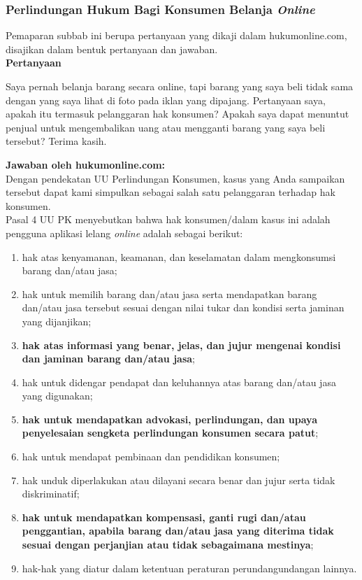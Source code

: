 \subsubsection{Perlindungan Hukum Bagi Konsumen Belanja \textit{Online}}
	Pemaparan subbab ini berupa pertanyaan yang dikaji dalam hukumonline.com, disajikan dalam bentuk pertanyaan dan jawaban.\\
\textbf{Pertanyaan}
\begin{displayquote}
	Saya pernah belanja barang secara online, tapi barang yang saya beli tidak sama dengan yang saya lihat di foto pada iklan yang dipajang. Pertanyaan saya, apakah itu termasuk pelanggaran hak konsumen? Apakah saya dapat menuntut penjual untuk mengembalikan uang atau mengganti barang yang saya beli tersebut? Terima kasih.
\end{displayquote}

\textbf{Jawaban oleh hukumonline.com:}\\
\indent Dengan pendekatan UU Perlindungan Konsumen, kasus yang Anda sampaikan tersebut dapat kami simpulkan sebagai salah satu pelanggaran terhadap hak konsumen. \\
\indent Pasal 4 UU PK menyebutkan bahwa hak konsumen/dalam kasus ini adalah pengguna aplikasi lelang \textit{online} adalah sebagai berikut:
\begin{enumerate}[label=\alph*.]
	\item hak atas kenyamanan, keamanan, dan keselamatan dalam mengkonsumsi barang dan/atau jasa;
	\item hak untuk memilih barang dan/atau jasa serta mendapatkan barang dan/atau jasa tersebut sesuai dengan nilai tukar dan kondisi serta jaminan yang dijanjikan;
	\item \textbf{hak atas informasi yang benar, jelas, dan jujur mengenai kondisi dan jaminan barang dan/atau jasa};
	\item hak untuk didengar pendapat dan keluhannya atas barang dan/atau jasa yang digunakan;
	\item \textbf{hak untuk mendapatkan advokasi, perlindungan, dan upaya penyelesaian sengketa perlindungan konsumen secara patut};
	\item hak untuk mendapat pembinaan dan pendidikan konsumen;
	\item hak unduk diperlakukan atau dilayani secara benar dan jujur serta tidak diskriminatif;
	\item \textbf{hak untuk mendapatkan kompensasi, ganti rugi dan/atau penggantian, apabila barang dan/atau jasa yang diterima tidak sesuai dengan perjanjian atau tidak sebagaimana mestinya};
	\item hak-hak yang diatur dalam ketentuan peraturan perundangundangan lainnya.
\end{enumerate}

